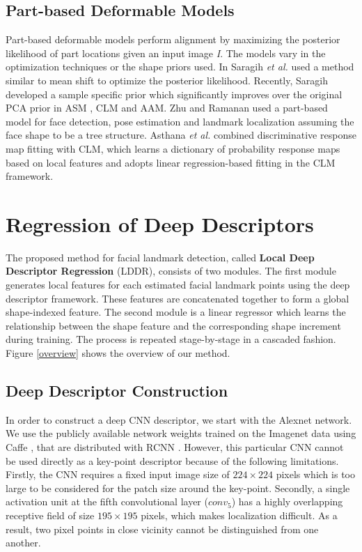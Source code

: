 \documentclass[10pt,twocolumn,letterpaper]{article}
\begin{document}
\subsection{Part-based Deformable Models}
Part-based deformable models perform alignment by maximizing the posterior likelihood of part locations given an input image \textit{I}. The models vary in the optimization techniques or the shape priors used. In \cite{conf/iccv/SaragihLC09} Saragih \textit{et al.} used a method similar to mean shift to optimize the posterior likelihood. Recently, Saragih \cite{DBLP:conf/cvpr/Saragih11} developed a sample specific prior which significantly improves over the original PCA prior in ASM , CLM and AAM. Zhu and Ramanan \cite{AFW_dataset_CVPR2012} used a part-based model for face detection, pose estimation and landmark localization assuming the face shape to be a tree structure. Asthana \textit{et al.} \cite{Asthana:2013:RDR:2514950.2516059}  combined discriminative response map fitting with CLM, which learns a dictionary of probability response maps based on local features and adopts linear regression-based fitting in the CLM framework. 

\section{Regression of Deep Descriptors}
\label{gen_inst}

The proposed method for facial landmark detection, called \textbf{Local Deep Descriptor Regression} (LDDR), consists of two modules. The first module generates local features for each estimated facial landmark points using the deep descriptor framework. These features are concatenated together to form a global shape-indexed feature. The second module is a linear regressor which learns the relationship between the shape feature and the corresponding shape increment during training. The process is repeated stage-by-stage in a cascaded fashion. Figure \ref{overview} shows the overview of our method.

\subsection{Deep Descriptor Construction}
\label{deep_descriptor}

 In order to construct a deep CNN descriptor, we start with the Alexnet \cite{NIPS2012_4824} network. We use the publicly available network weights trained on the Imagenet \cite{ILSVRC15} data using Caffe \cite{jia2014caffe}, that are distributed with RCNN \cite{girshick14CVPR} . However, this particular CNN cannot be used directly as a key-point descriptor because of the following limitations. Firstly, the CNN requires a fixed input image size of $224 \times 224$ pixels which is too large to be considered for the patch size around the key-point. Secondly, a single activation unit at the fifth convolutional layer ($conv_5$) has a highly overlapping receptive field of size $195 \times 195$ pixels, which makes localization difficult. As a result, two pixel points in close vicinity cannot be distinguished from one another.
\end{document}
